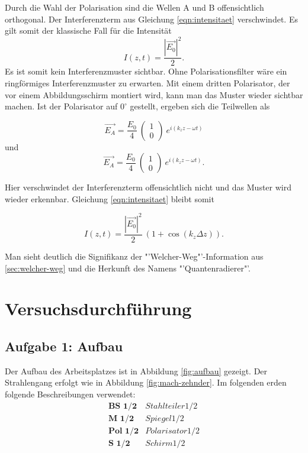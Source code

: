 \documentclass[a4paper,ngerman]{scrartcl}
\begin{document}
Durch die Wahl der Polarisation sind die Wellen A und B offensichtlich orthogonal. Der Interferenzterm aus Gleichung \ref{eqn:intensitaet} verschwindet. Es gilt somit der klassische Fall für die Intensität
\begin{equation}
I(z,t) = \frac{|\vec{E_0}|^2}{2}.
\end{equation}
Es ist somit kein Interferenzmuster sichtbar. 
Ohne Polarisationsfilter wäre ein ringförmiges Interferenzmuster zu erwarten.
Mit einem dritten Polarisator, der vor einem Abbildungsschirm montiert wird, kann man das Muster wieder sichtbar machen. 
Ist der Polarisator auf $0^{\circ}$ gestellt, ergeben sich die Teilwellen als

\begin{equation}
\vec{E_A} = \frac{E_0}{4} \ \begin{pmatrix} 1\\ 0 \end{pmatrix} \ e^{i (k_z z -\omega t)}
\end{equation}
und
\begin{equation}
\vec{E_A} = \frac{E_0}{4} \ \begin{pmatrix} 1\\ 0 \end{pmatrix} \ e^{i (k_z z -\omega t)}.
\end{equation}

Hier verschwindet der Interferenzterm offensichtlich nicht und das Muster wird wieder erkennbar. Gleichung \ref{eqn:intensitaet} bleibt somit

\begin{equation}
I(z,t) = \frac{|\vec{E_0}|^2}{2} \ (1+\cos(k_z\Delta z) ).
\end{equation}

Man sieht deutlich die Signifikanz der "'Welcher-Weg"'-Information aus \ref{sec:welcher-weg} und die Herkunft des Namens "'Quantenradierer"'.


\section{Versuchsdurchführung}
\label{sec:versuchsdurchfuhrung}

\subsection{Aufgabe 1: Aufbau}
\label{ssec:aufbau}

Der Aufbau des Arbeitsplatzes ist in Abbildung \ref{fig:aufbau} gezeigt. Der Strahlengang erfolgt wie in Abbildung \ref{fig:mach-zehnder}. Im folgenden erden folgende Beschreibungen verwendet:
\[
\begin{matrix}
\textbf{BS 1/2}	&	Stahlteiler 1/2 \\
\textbf{M 1/2}	&	Spiegel 1/2 \\
\textbf{Pol 1/2}	&	Polarisator 1/2 \\
\textbf{S 1/2}	&	Schirm 1/2 \\
\end{matrix}
\]
\end{document}
